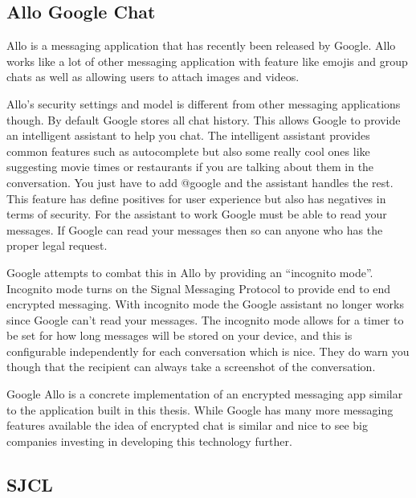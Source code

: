 \cite{whisper-overview}
\cite{whisper-protocol}


\subsection{Allo Google Chat}


Allo is a messaging application that has recently been released by Google. Allo works like a lot of other messaging application with feature like emojis and group chats as well as allowing users to attach images and videos. 


Allo’s security settings and model is different from other messaging applications though. By default Google stores all chat history. This allows Google to provide an intelligent assistant to help you chat. The intelligent assistant provides common features such as autocomplete but also some really cool ones like suggesting movie times or restaurants if you are talking about them in the conversation. You just have to add @google and the assistant handles the rest. This feature has define positives for user experience but also has negatives in terms of security. For the assistant to work Google must be able to read your messages. If Google can read your messages then so can anyone who has the proper legal request.


Google attempts to combat this in Allo by providing an “incognito mode”. Incognito mode turns on  the Signal Messaging Protocol to provide end to end encrypted messaging. With incognito mode the Google assistant no longer works since Google can’t read your messages. The incognito mode allows for a timer to be set for how long messages will be stored on your device, and this is configurable independently for each conversation which is nice. They do warn you though that the recipient can always take a screenshot of the conversation.


Google Allo is a concrete implementation of an encrypted messaging app similar to the application built in this thesis. While Google has many more messaging features available the idea of encrypted chat is similar and nice to see big companies investing in developing this technology further.


\cite{google-allo}
\cite{whisper-allo}


\subsection{SJCL}


